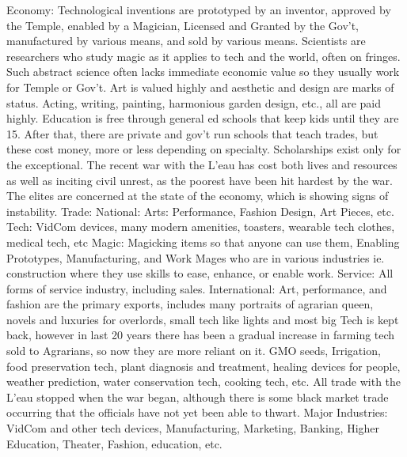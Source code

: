 \documentclass[blue]{GL2020}
\begin{document}
Economy:		Technological inventions are prototyped by an inventor, approved by the Temple, enabled by a
						Magician, Licensed and Granted by the Gov't, manufactured by various means, and sold by 
						various means.  Scientists are researchers who study magic as it applies to tech and the world, 
						often on fringes. Such abstract science often lacks immediate economic value 
						so they usually work for Temple or Gov't.  Art is valued highly and aesthetic and design are marks
						of status.  Acting, writing, painting, harmonious garden design, etc., all are paid highly.
						Education is free through general ed schools that keep kids until they are 15.  After that, there
						are private and gov't run schools that teach trades, but these cost money, more or less depending 
						on specialty.  Scholarships exist only for the exceptional.  The recent war with the L'eau has 
						cost both lives and resources as well as inciting civil unrest, as the poorest have been hit 
						hardest by the war.  The elites are concerned at the state of the economy, which is showing 
						signs of instability.
	Trade:		National:		Arts:		Performance, Fashion Design, Art Pieces, etc.
												Tech:		VidCom devices, many modern amenities, toasters, wearable tech clothes, 
													medical tech, etc
												Magic:		Magicking items so that anyone can use them, Enabling Prototypes,
													Manufacturing, and Work Mages who are in various industries ie. construction 
													where they use skills to ease, enhance, or enable work.
												Service:		All forms of service industry, including sales.
						International:		Art, performance, and fashion are the primary exports, includes many portraits 
												of agrarian queen, novels and luxuries for overlords, small tech like lights and 
												most big Tech is kept back, however in last 20 years there has been a gradual increase
												in farming tech sold to Agrarians, so now they are more reliant on it.  GMO seeds,
												Irrigation, food preservation tech, plant diagnosis and treatment, healing devices 
												for people, weather prediction, water conservation tech, cooking tech, etc.  All 
												trade with the L'eau stopped when the war began, although there is some black market
												trade occurring that the officials have not yet been able to thwart.
	Major Industries:  VidCom and other tech devices, Manufacturing, Marketing, Banking, Higher Education, 
									Theater, Fashion, education, etc.
	
\end{document}
